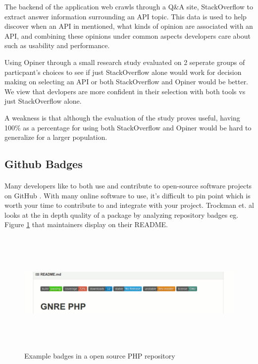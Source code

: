 \documentclass[12pt]{article}
\begin{document}
The backend of the application web crawls through a Q\&A site, StackOverflow \cite{stackoverflow} to extract answer
information surrounding an API topic. This data is used to help discover when an API in mentioned, what kinds of opinion
are associated with an API, and combining these opinions under common aspects developers care about such as usability and performance.

Using Opiner \cite{opiner} through a small research study evaluated on 2 seperate groups of particpant's choices to see if 
just StackOverflow \cite{stackoverflow} alone would work for decision making on selecting an API or both StackOverflow and Opiner would be better.
We view that devlopers are more confident in their selection with both tools vs just StackOverflow alone. 

A weakness is that although the evaluation of the study proves useful, having 100\% as a percentage for using both StackOverflow and Opiner
would be hard to generalize for a larger population. 

\subsection{Github Badges}
\paragraph{}
Many developers like to both use and contribute to open-source software projects on GitHub \cite{github}. 
With many online software to use, it's difficult to pin point which is worth your time to contribute to and integrate with your project.
Trockman et. al \cite{githubbadges} looks at the in depth quality of a package by analyzing repository badges eg. Figure \ref{phpbadge} that maintainers display on their README.

\begin{figure}
    \centering
    \includegraphics[width=\textwidth,height=6cm,keepaspectratio=true]{gnrephpbadges}
    \caption{
        Example badges in a open source PHP repository \protect\cite{badgeimage}
    }
    \label{phpbadge}
\end{figure}
\end{document}
